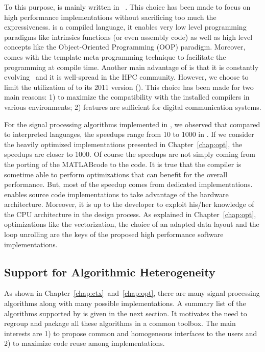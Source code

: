 To this purpose, \AFFECT is mainly written in \Cxx~\cite{Stroustrup2013}. This
choice has been made to focus on high performance implementations without
sacrificing too much the expressiveness. \Cxx is a compiled language, it enables
very low level programming paradigms like intrinsics functions (or even assembly
code) as well as high level concepts like the Object-Oriented Programming (OOP)
paradigm. Moreover, \Cxx comes with the template meta-programming technique
to facilitate the programming at compile time. Another main advantage of \Cxx is
that it is constantly evolving~\cite{Stroustrup2020} and it is well-spread in
the HPC community. However, we choose to limit the utilization of \Cxx to its
2011 version (). This choice has been made for two main reasons: 1) to
maximize the compatibility with the installed compilers in various environments;
2)  features are sufficient for digital communication systems.

For the signal processing algorithms implemented in \AFFECT, we observed that
compared to interpreted languages, the speedups range from 10 to 1000 in \Cxx.
If we consider the heavily optimized implementations presented in
Chapter~\ref{chap:opt}, the speedups are closer to 1000. Of course the speedups
are not simply coming from the porting of the MATLAB\R code to the \Cxx code. It
is true that the compiler is sometime able to perform optimizations that can
benefit for the overall performance. But, most of the speedup comes from
dedicated implementations. \Cxx enables source code implementations to take
advantage of the hardware architecture. Moreover, it is up to the developer to
exploit his/her knowledge of the CPU architecture in the design process. As
explained in Chapter~\ref{chap:opt}, optimizations like the vectorization, the
choice of an adapted data layout and the loop unrolling are the keys of the
proposed high performance software implementations.

\subsection{Support for Algorithmic Heterogeneity}

As shown in Chapter~\ref{chap:ctx}~and~\ref{chap:opt}, there are many signal
processing algorithms along with many possible implementations. A summary list
of the algorithms supported by \AFFECT is given in the next section. It
motivates the need to regroup and package all these algorithms in a common
toolbox. The main interests are 1) to propose common and homogeneous interfaces
to the users and 2) to maximize code reuse among implementations.

